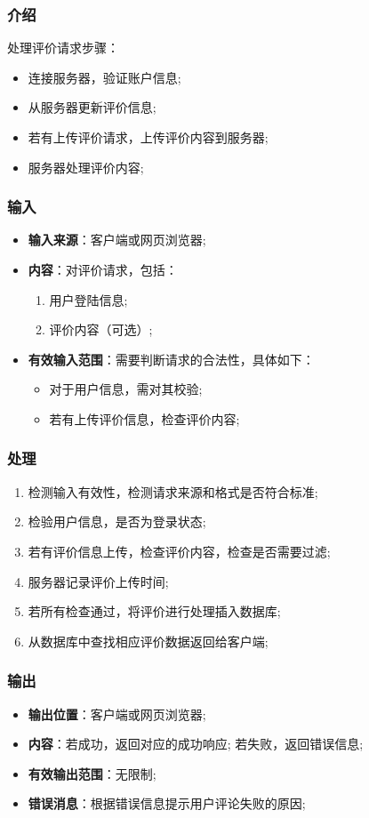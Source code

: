 \subsubsection{介绍}
	处理评价请求步骤：
	\begin{itemize}
		\item 连接服务器，验证账户信息;
		\item 从服务器更新评价信息;
		\item 若有上传评价请求，上传评价内容到服务器;
		\item 服务器处理评价内容;
	\end{itemize}
\subsubsection{输入}
	\begin{itemize}
		\item \textbf{输入来源}：客户端或网页浏览器;
		\item \textbf{内容}：对评价请求，包括：
		\begin{enumerate}
			\item 用户登陆信息;
			\item 评价内容（可选）;
		\end{enumerate}
		\item \textbf{有效输入范围}：需要判断请求的合法性，具体如下：
		\begin{itemize}
			\item 对于用户信息，需对其校验; 
			\item 若有上传评价信息，检查评价内容; 
		\end{itemize}
	\end{itemize}
\subsubsection{处理}
	\begin{enumerate}
		\item 检测输入有效性，检测请求来源和格式是否符合标准;
		\item 检验用户信息，是否为登录状态;
		\item 若有评价信息上传，检查评价内容，检查是否需要过滤;
		\item 服务器记录评价上传时间;
		\item 若所有检查通过，将评价进行处理插入数据库;
		\item 从数据库中查找相应评价数据返回给客户端;
	\end{enumerate}
\subsubsection{输出}
\begin{itemize}
	\item \textbf{输出位置}：客户端或网页浏览器;
	\item \textbf{内容}：若成功，返回对应的成功响应; 若失败，返回错误信息;
	\item \textbf{有效输出范围}：无限制;
	\item \textbf{错误消息}：根据错误信息提示用户评论失败的原因;
\end{itemize}

